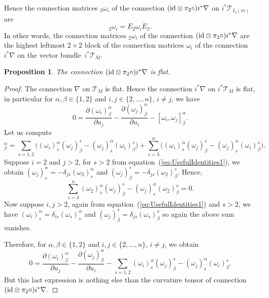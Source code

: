 \documentclass[10pt,a4paper]{amsart}
\numberwithin{equation}{section}
\newtheorem{Proposition}[Theorem]{Proposition}
 { \theoremstyle{definition}
\newtheorem{Definition}[Theorem]{Definition}
\newtheorem{Note}[Theorem]{Note}
\newtheorem{Example}[Theorem]{Example}
\newtheorem{Remark}[Theorem]{Remark} }
\begin{document}
 Hence the connection matrices $_{2}\omega_{i}$ of the connection $({\rm id}\otimes\pi_{2}\circ)i^{*}\nabla$ on $i^{*}\mathcal{T}_{I_{2}(m)}$ are
 \begin{equation*}
 _{2}\omega_{i}=E_{2}\omega_{i}E_{2}.
 \end{equation*}
 In other words, the connection matrices $_{2}\omega_{i}$ of the connection $({\rm id}\otimes\pi_{2}\circ)i^{*}\nabla$ are the highest leftmost $2\times 2$ block of the connection matrices $\omega_{i}$ of the connection $i^{*}\nabla$ on the vector bundle~$i^{*}\mathcal{T}_{M}$.
 \begin{Proposition}
 \label{prop:FlatnessDiagonalConnection}
 The connection $({\rm id}\otimes\pi_{2}\circ)i^{*}\nabla$ is flat.
 \end{Proposition}
 \begin{proof}
 The connection $\nabla$ on $\mathcal{T}_{M}$ is flat. Hence the connection $i^{*}\nabla$ on $i^{*}\mathcal{T}_{M}$ is flat, in particular for $\alpha,\beta\in\{ 1,2 \}$ and $i,j\in\{ 2,\dots,n \}$, $i\neq j$, we have
 \begin{equation*}
 0=\frac{\partial (\omega_{i})^{\alpha}_{\beta}}{\partial u_{j}}-\frac{\partial (\omega_{j})^{\alpha}_{\beta}}{\partial u_{i}}-[\omega_{i},\omega_{j}]^{\alpha}_{\beta}.
 \end{equation*}
 Let us compute
 \begin{equation*}
 [\omega_{i},\omega_{j}]^{\alpha}_{\beta}=\sum_{s=1,2}\bigl((\omega_{i})^{\alpha}_{s}(\omega_{j})^{s}_{\beta}-(\omega_{j})^{\alpha}_{s}(\omega_{i})^{s}_{\beta}\bigr)
 +\sum_{s=3}^{n}\bigl((\omega_{i})^{\alpha}_{s}(\omega_{j})^{s}_{\beta}-(\omega_{j})^{\alpha}_{s}(\omega_{i})^{s}_{\beta}\bigr).
 \end{equation*}
 Suppose $i=2$ and $j>2$, for $s>2$ from equation~(\ref{eq:UsefulIdentities1}), we obtain $(\omega_{j})^{\alpha}_{s}=-\delta_{js}(\omega_{2})^{\alpha}_{s}$ and $(\omega_{j})^{s}_{\beta}=-\delta_{js}(\omega_{2})^{s}_{\beta}$. Hence,
 \begin{equation*}
 \sum_{s=3}^{n}(\omega_{2})^{\alpha}_{s}(\omega_{j})^{s}_{\beta}-(\omega_{j})^{\alpha}_{s}(\omega_{2})^{s}_{\beta}=0.
 \end{equation*}
 Now suppose $i,j>2$, again from equation~(\ref{eq:UsefulIdentities1}) and $s>2$, we have $(\omega_{i})^{\alpha}_{s}=\delta_{is}(\omega_{s})^{\alpha}_{s}$ and $(\omega_{j})^{s}_{\beta}=\delta_{js}(\omega_{s})^{s}_{\beta}$ so again the above sum vanishes.

 Therefore, for $\alpha,\beta\in\{ 1,2 \}$ and $i,j\in\{ 2,\dots,n \}$, $i\neq j$, we obtain
 \begin{equation*}
 0=\frac{\partial (\omega_{i})^{\alpha}_{\beta}}{\partial u_{j}}-\frac{\partial (\omega_{j})^{\alpha}_{\beta}}{\partial u_{i}}-\sum_{s=1,2}(\omega_{i})^{\alpha}_{s}(\omega_{j})^{s}_{\beta}-(\omega_{j})^{\alpha}_{s}(\omega_{i})^{s}_{\beta}.
 \end{equation*}
 But this last expression is nothing else than the curvature tensor of connection $({\rm id}\otimes\pi_{2}\circ)i^{*}\nabla$.
 \end{proof}
\end{document}
